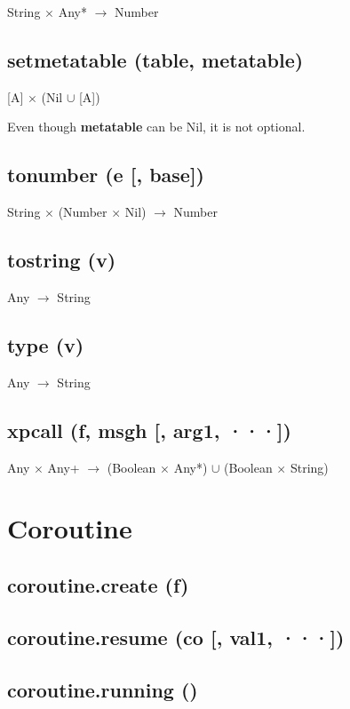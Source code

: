 \documentclass[12pt]{article}
\begin{document}
String $\times$ Any* $\rightarrow$ Number

\subsection{setmetatable (table, metatable)}

[A] $\times$ (Nil $\cup$ [A])

Even though \textbf{metatable} can be Nil, it is not optional.

\subsection{tonumber (e [, base])}

String $\times$ (Number $\times$ Nil) $\rightarrow$ Number

\subsection{tostring (v)}

Any $\rightarrow$ String

\subsection{type (v)}

Any $\rightarrow$ String

\subsection{xpcall (f, msgh [, arg1, ···])}

Any $\times$ Any+ $\rightarrow$
(Boolean $\times$ Any*) $\cup$
(Boolean $\times$ String)

\newpage

\section{Coroutine}

\subsection{coroutine.create (f)}

\subsection{coroutine.resume (co [, val1, ···])}

\subsection{coroutine.running ()}
\end{document}
